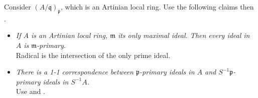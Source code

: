 \begin{exercise}\label{ex8.6}
 	Consider $(A/\mathfrak{q})_{\overline{\mathfrak{p}}}$, which is an Artinian local ring. Use the following claims then .
 	\begin{itemize}
 		\item \textit{If $A$ is an Artinian local ring, $\mathfrak{m}$ its only maximal ideal. Then every ideal in $A$ is $\mathfrak{m}$-primary.}\\ Radical is the intersection of the only prime ideal.
 		\item \textit{There is a 1-1 correspondence between $\mathfrak{p}$-primary ideals in $A$ and $S^{-1}\mathfrak{p}$-primary ideals in $S^{-1}A$.}\\
 		Use  and .
 	\end{itemize}
\end{exercise}